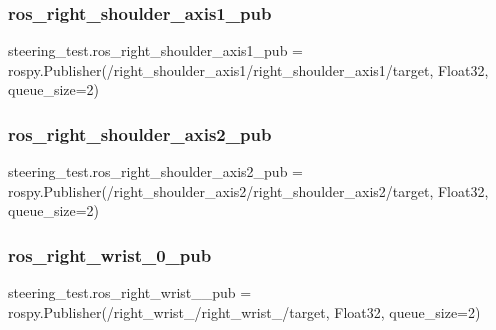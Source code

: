 \subsubsection{\texorpdfstring{ros\_right\_shoulder\_axis1\_pub}{ros\_right\_shoulder\_axis1\_pub}}
{\footnotesize\ttfamily steering\+\_\+test.\+ros\+\_\+right\+\_\+shoulder\+\_\+axis1\+\_\+pub = rospy.\+Publisher(\textquotesingle{}/right\+\_\+shoulder\+\_\+axis1/right\+\_\+shoulder\+\_\+axis1/target\textquotesingle{}, Float32, queue\+\_\+size=2)}

\mbox{\label{namespacesteering__test_a5ec29f49e4b6de223ae73a43e4b81bab}} 
\subsubsection{\texorpdfstring{ros\_right\_shoulder\_axis2\_pub}{ros\_right\_shoulder\_axis2\_pub}}
{\footnotesize\ttfamily steering\+\_\+test.\+ros\+\_\+right\+\_\+shoulder\+\_\+axis2\+\_\+pub = rospy.\+Publisher(\textquotesingle{}/right\+\_\+shoulder\+\_\+axis2/right\+\_\+shoulder\+\_\+axis2/target\textquotesingle{}, Float32, queue\+\_\+size=2)}

\mbox{\label{namespacesteering__test_aa52230dd83b1d4238ff1ed66e9c8dcb0}} 
\subsubsection{\texorpdfstring{ros\_right\_wrist\_0\_pub}{ros\_right\_wrist\_0\_pub}}
{\footnotesize\ttfamily steering\+\_\+test.\+ros\+\_\+right\+\_\+wrist\+\_\+\_\+pub = rospy.\+Publisher(\textquotesingle{}/right\+\_\+wrist\+\_/right\+\_\+wrist\+\_/target\textquotesingle{}, Float32, queue\+\_\+size=2)}

\mbox{\label{namespacesteering__test_a36ffa072e07b0e9d175e7617d457043f}} 
